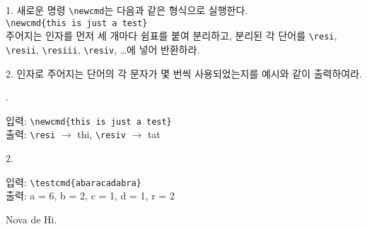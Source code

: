 \documentclass[a4paper,amsmath,itemph]{oblivoir}
\begin{document}
\begin{questionp}
 1. 새로운 명령 \verb|\newcmd|는 다음과 같은 형식으로 실행한다.\\
\verb|\newcmd{this is just a test}|\\
주어지는 인자를 먼저 세 개마다 쉼표를 붙여 분리하고, 분리된 각 단어를 \verb|\resi|, \verb|\resii|, \verb|\resiii|, \verb|\resiv|, \ldots 에 넣어 반환하라.

\bigskip

 2. 인자로 주어지는 단어의 각 문자가 몇 번씩 사용되었는지를 예시와 같이 출력하여라.

. \begin{minipage}[t]{\dimexpr\textwidth-3em\relax}
입력: \verb|\newcmd{this is just a test}|\\
출력: \verb|\resi| $\rightarrow$ thi, \verb|\resiv| $\rightarrow$ tat
\end{minipage}

\medskip

2. \begin{minipage}[t]{\dimexpr\textwidth-3em\relax}
입력: \verb|\testcmd{abaracadabra}| \\
출력: a = 6, b = 2, c = 1, d = 1, r = 2
\end{minipage}

\end{questionp}

\vfill


\hfill Nova de Hi.
\end{document}

